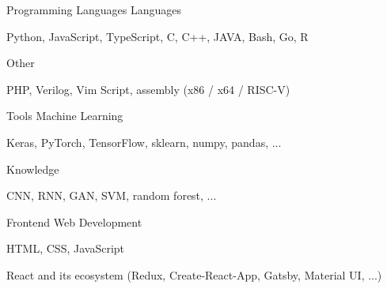 

\begin{cventries}

  \cventry
    {Programming Languages}
    {Languages}
    {}
    {}
    {
      \begin{cvitems}
        \item {Python, JavaScript, TypeScript, C, C++, JAVA, Bash, Go, R}
      \end{cvitems}
    }

  \cventry
    {Other}
    {}
    {}
    {}
    {
      \begin{cvitems}
        \item {PHP, Verilog, Vim Script, assembly (x86 / x64 / RISC-V)}
      \end{cvitems}
    }
    
  \cventry
    {Tools}
    {Machine Learning}
    {}
    {}
    {
      \begin{cvitems}
        \item {Keras, PyTorch, TensorFlow, sklearn, numpy, pandas, ...}
      \end{cvitems}
    }

  \cventry
    {Knowledge}
    {}
    {}
    {}
    {
      \begin{cvitems}
        \item {CNN, RNN, GAN, SVM, random forest, ...}
      \end{cvitems}
    }
    
  \cventry
    {Frontend}
    {Web Development}
    {}
    {}
    {
      \begin{cvitems}
        \item {HTML, CSS, JavaScript}
        \item {React and its ecosystem (Redux, Create-React-App, Gatsby, Material UI, ...)}
      \end{cvitems}
    }


\end{cventries}
